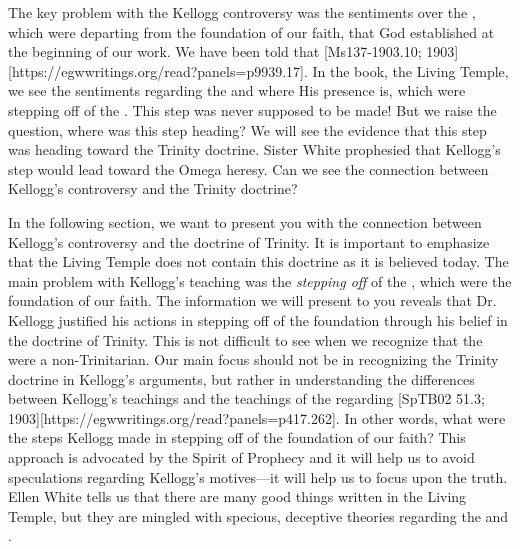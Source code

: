 
The key problem with the Kellogg controversy was the sentiments over the , which were departing from the foundation of our faith, that God established at the beginning of our work. We have been told that [Ms137-1903.10; 1903][https://egwwritings.org/read?panels=p9939.17]. In the book, the Living Temple, we see the sentiments regarding the  and where His presence is, which were stepping off of the . This step was never supposed to be made! But we raise the question, where was this step heading? We will see the evidence that this step was heading toward the Trinity doctrine. Sister White prophesied that Kellogg’s step would lead toward the Omega heresy. Can we see the connection between Kellogg’s controversy and the Trinity doctrine?

In the following section, we want to present you with the connection between Kellogg’s controversy and the doctrine of Trinity. It is important to emphasize that the Living Temple does not contain this doctrine as it is believed today. The main problem with Kellogg’s teaching was the \textit{stepping off} of the , which were the foundation of our faith. The information we will present to you reveals that Dr. Kellogg justified his actions in stepping off of the foundation through his belief in the doctrine of Trinity. This is not difficult to see when we recognize that the  were a non-Trinitarian. Our main focus should not be in recognizing the Trinity doctrine in Kellogg's arguments, but rather in understanding the differences between Kellogg’s teachings and the teachings of the  regarding [SpTB02 51.3; 1903][https://egwwritings.org/read?panels=p417.262]. In other words, what were the steps Kellogg made in stepping off of the foundation of our faith? This approach is advocated by the Spirit of Prophecy and it will help us to avoid speculations regarding Kellogg’s motives—it will help us to focus upon the truth. Ellen White tells us that there are many good things written in the Living Temple, but they are mingled with specious, deceptive theories regarding the  and .


